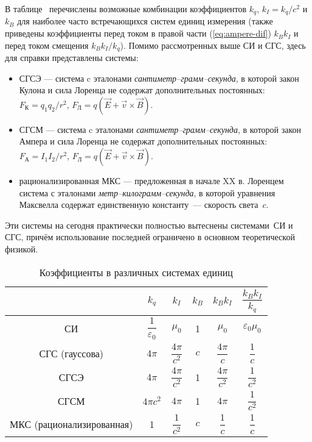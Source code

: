 В таблице~ перечислены возможные комбинации коэффициентов $k_{q}$, $k_{I}=k_{q}/c^{2}$
и $k_{B}$ для наиболее часто встречающихся систем единиц измерения
(также приведены коэффициенты перед током в правой части (\ref{eq:ampere-dif})
$k_{B}k_{I}$ и перед током смещения $k_{B}k_{I}/k_{q}$).
Помимо рассмотренных выше СИ и СГС, здесь для справки представлены системы:
\begin{itemize}
\item СГСЭ --- система c эталонами \emph{сантиметр--грамм--секунда},
    в которой закон Кулона и сила Лоренца не содержат дополнительных постоянных:
    $F_К = q_1q_2/r^2$, $F_Л = q(\vec{E} + \vec{v}\times \vec{B})$.
\item СГСМ --- система c эталонами \emph{сантиметр--грамм--секунда},
в которой закон Ампера и сила Лоренца не содержат дополнительных постоянных:
$F_А = I_1I_2/r^2$, $F_Л = q(\vec{E} + \vec{v}\times \vec{B})$.
\item рационализированная МКС --- предложенная в начале XX в. Лоренцем система
с эталонами \emph{метр--килограмм--секунда}, в которой уравнения
Максвелла содержат единственную константу~--- скорость света~$c$.
\end{itemize}
Эти системы на сегодня практически полностью вытеснены системами~СИ и
СГС, причём использование последней ограничено в основном
теоретической физикой.

\begin{table}[h!]
    \caption{Коэффициенты в различных системах единиц}
    \small
    \renewcommand{\arraystretch}{2}
    \centering
    \begin{tabular}{cccccc}
        \toprule
        & $k_{q}$ & $k_{I}$ & $k_{B}$ & $k_{B}k_{I}$
        & $\dfrac{k_{B}k_{I}}{k_{q}}$\\
        \midrule
        СИ & $\dfrac{1}{\varepsilon_{0}}$ & $\mu_{0}$ & 1 & $\mu_{0}$
        & $\varepsilon_{0}\mu_{0}$\\[1ex] \hline
        СГС (гауссова) & $4\pi$ & $\dfrac{4\pi}{c^{2}}$ & $c$ & $\dfrac{4\pi}{c}$ & $\dfrac{1}{c}$ \\[1ex] \hline
        СГСЭ & $4\pi$ & $\dfrac{4\pi}{c^{2}}$ & 1 & $\dfrac{4\pi}{c^{2}}$
        & $\dfrac{1}{c^{2}}$ \\[1ex] \hline
        СГСМ & $4\pi c^{2}$ & $4\pi$ & 1 & $4\pi$ & $\dfrac{1}{c^{2}}$ \\[1ex] \hline
        МКС (рационализированная) & 1 & $\dfrac{1}{c^{2}}$ & $c$ & $\dfrac{1}{c}$ & $\dfrac{1}{c}$\\
        \bottomrule
    \end{tabular}
\end{table}

